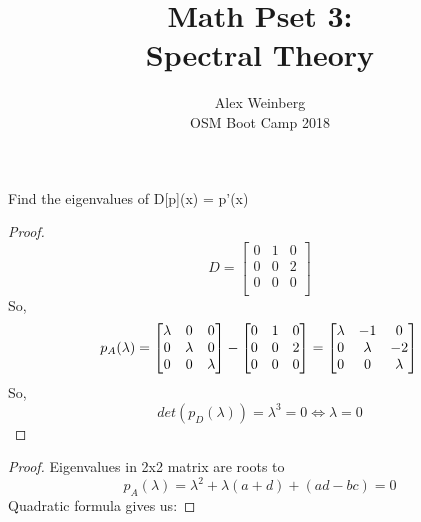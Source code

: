 \documentclass[12pt]{amsart}
\title{Math Pset 3:\\
       Spectral Theory}
\author{Alex Weinberg\\
        OSM Boot Camp 2018}
\newenvironment{problem}[2][Problem]{\begin{trivlist}
\item[\hskip \labelsep {\bfseries #1}\hskip \labelsep {\bfseries #2.}]}{\end{trivlist}}
\begin{document}
\maketitle


\begin{problem}{2} Find the eigenvalues of D[p](x) = p'(x)
\end{problem}
\begin{proof}
    \[
 D =   \begin{bmatrix}
    0 & 1 & 0 \\
    0 & 0 & 2 \\
    0 & 0 & 0 \\
    \end{bmatrix}
    \]
    So, \[ p_A(\lambda) = 
   \begin{bmatrix}
    \lambda & 0 & 0 \\
    0 & \lambda & 0 \\
    0 & 0 & \lambda \\
    \end{bmatrix} -
    \begin{bmatrix}
    0 & 1 & 0 \\
    0 & 0 & 2 \\
    0 & 0 & 0 \\
\end{bmatrix} =
\begin{bmatrix}
    \lambda & -1 & 0 \\
    0 & \lambda & -2 \\
    0 & 0 & \lambda \\
\end{bmatrix}\\
\]
So, \[
det(p_D(\lambda)) = \lambda^3 =0 \iff \lambda=0
\]
\end{proof}

\begin{problem}{4}
\begin{proof}
    Eigenvalues in 2x2 matrix are roots to 
    \[p_A(\lambda) = \lambda^2 + \lambda(a+d) + (ad - bc) = 0
    \]
    Quadratic formula gives us:
\end{proof}
\end{problem}
\end{document}
